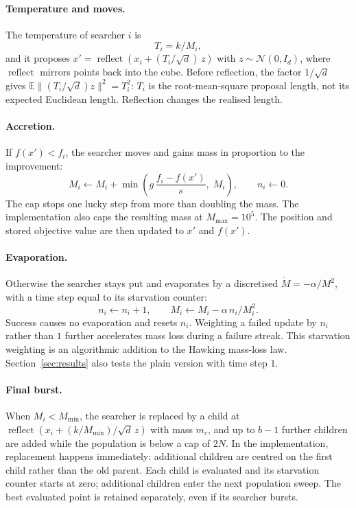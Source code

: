 \documentclass[10pt,a4paper]{article}
\newcommand{\Mmin}{M_{\min}}
\begin{document}
\paragraph{Temperature and moves.} The temperature of searcher $i$ is
\begin{equation}
  T_i = k / M_i, \label{eq:temperature}
\end{equation}
and it proposes $x' = \operatorname{reflect}\!\left(x_i + (T_i/\sqrt d)\,z\right)$
with $z\sim\mathcal N(0,I_d)$, where $\operatorname{reflect}$ mirrors points back into
the cube. Before reflection, the factor $1/\sqrt d$ gives
$\mathbb E\lVert (T_i/\sqrt d)z\rVert^2=T_i^2$: $T_i$ is the root-mean-square proposal
length, not its expected Euclidean length. Reflection changes the realised length.

\paragraph{Accretion.} If $f(x') < f_i$, the searcher moves and gains mass in
proportion to the improvement:
\begin{equation}
  M_i \leftarrow M_i + \min\!\left(g\,\frac{f_i - f(x')}{s},\; M_i\right),\qquad n_i \leftarrow 0.
  \label{eq:accretion}
\end{equation}
The cap stops one lucky step from more than doubling the mass. The implementation
also caps the resulting mass at $M_{\max}=10^5$. The position and stored objective
value are then updated to $x'$ and $f(x')$.

\paragraph{Evaporation.} Otherwise the searcher stays put and evaporates by a
discretised $\dot M = -\alpha/M^2$, with a time step equal to its starvation counter:
\begin{equation}
  n_i \leftarrow n_i + 1,\qquad M_i \leftarrow M_i - \alpha\,n_i / M_i^2.
  \label{eq:evaporation}
\end{equation}
Success causes no evaporation and resets $n_i$. Weighting a failed update by
$n_i$ rather than $1$ further accelerates mass loss during a failure streak. This
starvation weighting is an algorithmic addition to the Hawking mass-loss law. Section~\ref{sec:results} also tests the plain version with time step $1$.

\paragraph{Final burst.} When $M_i < \Mmin$, the searcher is replaced by a child at
$\operatorname{reflect}(x_i + (k/\Mmin)/\sqrt d\,z)$ with mass $m_c$, and up to $b-1$
further children are added while the population is below a cap of $2N$. In the
implementation, replacement happens immediately: additional children are centred
on the first child rather than the old parent. Each child is evaluated and its
starvation counter starts at zero; additional children enter the next population
sweep. The best evaluated point is retained separately, even if its searcher bursts.
\end{document}
